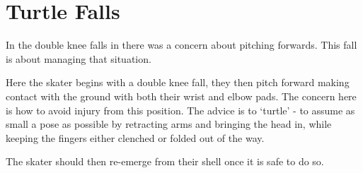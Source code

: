 \section{Turtle Falls}
\label{sec:fall/turtle}

In the double knee falls in  there was a concern about pitching forwards.
This fall is about managing that situation. 


Here the skater begins with a double knee fall, they then pitch forward making contact with the ground with both their wrist and elbow pads.   
The concern here is how to avoid injury from this position.
The advice is to `turtle' - to assume as small a pose as possible by retracting arms and bringing the head in, while keeping the fingers either clenched or folded out of the way.    

The skater should then re-emerge from their shell once it is safe to do so.  
